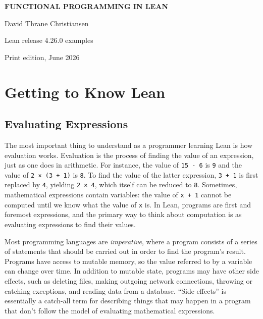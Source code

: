 \documentclass[10pt,letterpaper,twoside,openright]{book}
\newcommand{\icode}[1]{\texttt{\small #1}}
\newcommand{\bookRule}{\noindent\makebox[\linewidth][r]{\rule{\linewidth}{1pt}}}
\begin{document}
\begin{titlepage}
\sffamily
\raggedleft
\vspace*{0.9in}
{\color{bookink}\bookRule\par}
\vspace{0.3in}
{\color{bookink}\Huge\bfseries FUNCTIONAL PROGRAMMING IN LEAN\par}
\vspace{0.28in}
{\Large David Thrane Christiansen\par}
\vspace{0.18in}
{\large Lean release 4.26.0 examples\par}
\vfill
{\large Print edition, June 2026\par}
\end{titlepage}
\frontmatter
\tableofcontents
\mainmatter
\chapter{Getting to Know Lean}

\section{Evaluating Expressions}

The most important thing to understand as a programmer learning Lean is how evaluation works. Evaluation is the process of finding the value of an expression, just as one does in arithmetic. For instance, the value of \icode{15 - 6} is \icode{9} and the value of \icode{2 × (3 + 1)} is \icode{8}. To find the value of the latter expression, \icode{3 + 1} is first replaced by \icode{4}, yielding \icode{2 × 4}, which itself can be reduced to \icode{8}. Sometimes, mathematical expressions contain variables: the value of \icode{x + 1} cannot be computed until we know what the value of \icode{x} is. In Lean, programs are first and foremost expressions, and the primary way to think about computation is as evaluating expressions to find their values.

Most programming languages are \emph{imperative}, where a program consists of a series of statements that should be carried out in order to find the program's result. Programs have access to mutable memory, so the value referred to by a variable can change over time. In addition to mutable state, programs may have other side effects, such as deleting files, making outgoing network connections, throwing or catching exceptions, and reading data from a database. “Side effects” is essentially a catch-all term for describing things that may happen in a program that don't follow the model of evaluating mathematical expressions.
\end{document}
